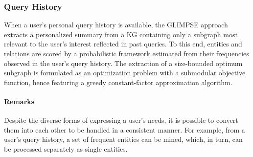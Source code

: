 \subsubsection{Query History}
When a user's personal query history is available, the GLIMPSE approach~\cite{DBLP:conf/icdm/SafaviBFMMK19} extracts a personalized summary from a KG containing only a subgraph most relevant to the user's interest reflected in past queries. To this end, entities and relations are scored by a probabilistic framework estimated from their frequencies observed in the user's query history. The extraction of a size-bounded optimum subgraph is formulated as an optimization problem with a submodular objective function, hence featuring a greedy constant-factor approximation algorithm.

\paragraph{Remarks}
Despite the diverse forms of expressing a user's needs, it is possible to convert them into each other to be handled in a consistent manner. For example, from a user's query history, a set of frequent entities can be mined, which, in turn, can be processed separately as single entities.